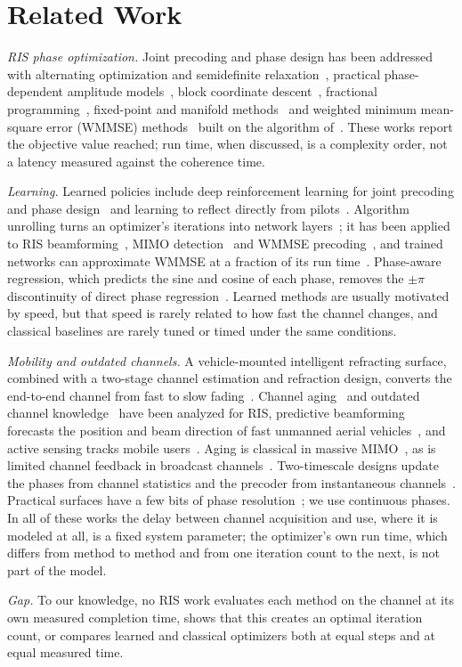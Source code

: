 \section{Related Work}
\label{sec:related_work}

\emph{RIS phase optimization.} Joint precoding and phase design has been addressed with alternating optimization and semidefinite relaxation~\cite{Wu2019TWC}, practical phase-dependent amplitude models~\cite{Abeywickrama2020TCOM}, block coordinate descent~\cite{Pan2020TWC}, fractional programming~\cite{Guo2020TWC}, fixed-point and manifold methods~\cite{Yu2019ICCC} and weighted minimum mean-square error (WMMSE) methods~\cite{Choi2024TCOM} built on the algorithm of~\cite{Shi2011TSP}. These works report the objective value reached; run time, when discussed, is a complexity order, not a latency measured against the coherence time.

\emph{Learning.} Learned policies include deep reinforcement learning for joint precoding and phase design~\cite{Huang2020JSAC} and learning to reflect directly from pilots~\cite{Jiang2021JSAC}. Algorithm unrolling turns an optimizer's iterations into network layers~\cite{Monga2021SPM}; it has been applied to RIS beamforming~\cite{Liu2022TWC}, MIMO detection~\cite{Samuel2019TSP} and WMMSE precoding~\cite{Hu2021TWC,Pellaco2022OJCOMS}, and trained networks can approximate WMMSE at a fraction of its run time~\cite{Sun2018TSP}. Phase-aware regression, which predicts the sine and cosine of each phase, removes the $\pm\pi$ discontinuity of direct phase regression~\cite{SavasciSen2026AISY}. Learned methods are usually motivated by speed, but that speed is rarely related to how fast the channel changes, and classical baselines are rarely tuned or timed under the same conditions.

\emph{Mobility and outdated channels.} A vehicle-mounted intelligent refracting surface, combined with a two-stage channel estimation and refraction design, converts the end-to-end channel from fast to slow fading~\cite{Huang2022TWC}. Channel aging~\cite{Papazafeiropoulos2023TVT} and outdated channel knowledge~\cite{Zhang2022TCOM} have been analyzed for RIS, predictive beamforming forecasts the position and beam direction of fast unmanned aerial vehicles~\cite{Liu2021WCL}, and active sensing tracks mobile users~\cite{Han2025TWC}. Aging is classical in massive MIMO~\cite{Truong2013JCN,Chopra2018TWC}, as is limited channel feedback in broadcast channels~\cite{Jindal2006IT}. Two-timescale designs update the phases from channel statistics and the precoder from instantaneous channels~\cite{Zhao2021TWC,Cao2022TWC}. Practical surfaces have a few bits of phase resolution~\cite{Wu2020TCOM,Zhao2024OJCOMS}; we use continuous phases. In all of these works the delay between channel acquisition and use, where it is modeled at all, is a fixed system parameter; the optimizer's own run time, which differs from method to method and from one iteration count to the next, is not part of the model.

\emph{Gap.} To our knowledge, no RIS work evaluates each method on the channel at its own measured completion time, shows that this creates an optimal iteration count, or compares learned and classical optimizers both at equal steps and at equal measured time.

